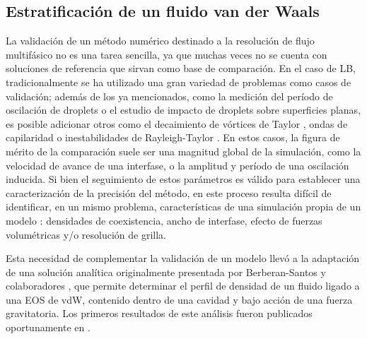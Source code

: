 \subsection{Estratificaci\'on de un fluido van der Waals}
\label{sec:vdw_1d}

La validaci\'on de un m\'etodo num\'erico destinado a la resoluci\'on de flujo multif\'asico no es una tarea sencilla, ya que muchas veces no se cuenta con soluciones de referencia que sirvan como base de comparaci\'on. En el caso de LB, tradicionalmente se ha utilizado una gran variedad de problemas como casos de validaci\'on; adem\'as de los ya mencionados, como la medici\'on del per\'iodo de oscilaci\'on de droplets o el estudio de impacto de droplets sobre superficies planas, es posible adicionar otros como el decaimiento de v\'ortices de Taylor \cite{guo_discrete_2002}, ondas de capilaridad \cite{mccracken_multiple-relaxation-time_2005} o inestabilidades de Rayleigh-Taylor \cite{li_additional_2012}. En estos casos, la figura de m\'erito de la comparaci\'on suele ser una magnitud global de la simulaci\'on, como la velocidad de avance de una interfase, o la amplitud y per\'iodo de una oscilaci\'on inducida. Si bien el seguimiento de estos par\'ametros es v\'alido para establecer una caracterizaci\'on de la precisi\'on del m\'etodo, en este proceso resulta dif\'icil de identificar, en un mismo problema, caracter\'isticas de una simulaci\'on propia de un modelo \pp{}: densidades de coexistencia, ancho de interfase, efecto de fuerzas volum\'etricas y/o resoluci\'on de grilla.

Esta necesidad de complementar la validaci\'on de un modelo \pp{} llev\'o a la adaptaci\'on de una soluci\'on anal\'itica originalmente presentada por Berberan-Santos y colaboradores \cite{berberan-santos_liquidvapor_2002}, que permite determinar el perfil de densidad de un fluido ligado a una EOS de vdW, contenido dentro de una cavidad y bajo acci\'on de una fuerza gravitatoria.  Los primeros resultados de este an\'alisis fueron publicados oportunamente en \cite{fogliatto_simulation_2019}.

